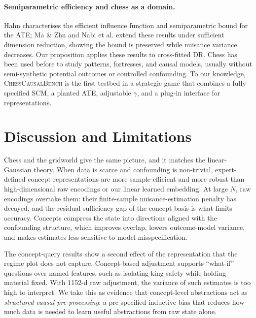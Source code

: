 \documentclass{article}
\begin{document}
\paragraph{Semiparametric efficiency and chess as a domain.}
Hahn\cite{hahn1998role} characterises the efficient influence function and
semiparametric bound for the ATE; Ma \& Zhu\cite{ma2012semiparametric} and
Nabi et al.\cite{nabi2022causal} extend these results under sufficient
dimension reduction, showing the bound is preserved while nuisance variance
decreases. Our proposition applies these results to cross-fitted DR. Chess has
been used before to study patterns, fortresses, and causal
models,\cite{lemeire2005causalmodelsinchess,fortressesPaper,causalMaskingSpatial}
usually without semi-synthetic potential outcomes or controlled confounding.
To our knowledge, \textsc{ChessCausalBench} is the first testbed in a strategic
game that combines a fully specified SCM, a planted ATE, adjustable $\gamma$,
and a plug-in interface for representations.

\section{Discussion and Limitations}

Chess and the gridworld give the same picture, and it matches the
linear-Gaussian theory. When data is scarce and confounding is non-trivial,
expert-defined concept representations are more sample-efficient and more
robust than high-dimensional raw encodings or our linear learned embedding. At
large $N$, raw encodings overtake them: their finite-sample nuisance-estimation
penalty has decayed, and the residual sufficiency gap of the concept basis is
what limits accuracy. Concepts compress the state into directions aligned with
the confounding structure, which improves overlap, lowers outcome-model
variance, and makes estimates less sensitive to model misspecification.

The concept-query results show a second effect of the representation that the
regime plot does not capture. Concept-based adjustment supports ``what-if''
questions over named features, such as isolating king safety while holding
material fixed. With 1152-d raw adjustment, the variance of such estimates is
too high to interpret. We take this as evidence that concept-level
abstractions act as \emph{structured causal pre-processing}: a pre-specified
inductive bias that reduces how much data is needed to learn useful
abstractions from raw state alone.
\end{document}

